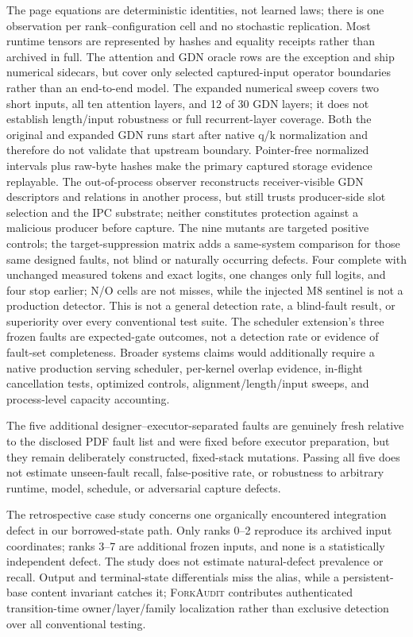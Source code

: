 \documentclass{article}
\newcommand{\method}{\textsc{ForkAudit}}
\begin{document}
The page equations are deterministic identities, not learned laws; there is
one observation per rank--configuration cell and no stochastic replication.
Most runtime tensors are represented by hashes and equality receipts rather
than archived in full.  The attention and GDN oracle rows are the exception
and ship numerical sidecars, but cover only selected captured-input operator
boundaries rather than an end-to-end model.  The expanded numerical sweep covers two
short inputs, all ten attention layers, and 12 of 30 GDN layers; it does not
establish length/input robustness or full recurrent-layer coverage.  Both the
original and expanded GDN runs start after native q/k normalization and
therefore do not validate that upstream boundary.  Pointer-free normalized
intervals plus raw-byte hashes make the primary captured storage evidence
replayable.  The out-of-process observer reconstructs receiver-visible GDN descriptors and relations
in another process, but still trusts producer-side slot selection and the IPC
substrate; neither constitutes protection against a malicious producer before
capture.  The nine mutants are targeted
positive controls; the target-suppression matrix adds a same-system comparison
for those same designed faults, not blind or naturally occurring defects.
Four complete with unchanged measured tokens and exact logits, one changes only full logits,
and four stop earlier; N/O cells are not misses, while the injected M8 sentinel
is not a production detector.  This is not a general detection rate, a
blind-fault result, or superiority over every conventional test suite.  The scheduler
extension's three frozen faults are expected-gate outcomes, not a detection
rate or evidence of fault-set completeness.  Broader systems claims would
additionally require a native production serving scheduler, per-kernel overlap
evidence, in-flight cancellation tests, optimized controls,
alignment/length/input sweeps, and process-level capacity accounting.

The five additional designer--executor-separated faults are genuinely fresh relative to the
disclosed PDF fault list and were fixed before executor preparation, but they
remain deliberately constructed, fixed-stack mutations.  Passing all five does
not estimate unseen-fault recall, false-positive rate, or robustness to arbitrary
runtime, model, schedule, or adversarial capture defects.

The retrospective case study concerns one organically encountered integration
defect in our borrowed-state path.  Only ranks 0--2 reproduce its archived
input coordinates; ranks 3--7 are additional frozen inputs, and none is a
statistically independent defect.  The study does not estimate natural-defect
prevalence or recall.  Output and terminal-state differentials miss the alias,
while a persistent-base content invariant catches it; \method{} contributes
authenticated transition-time owner/layer/family localization rather than
exclusive detection over all conventional testing.
\end{document}
